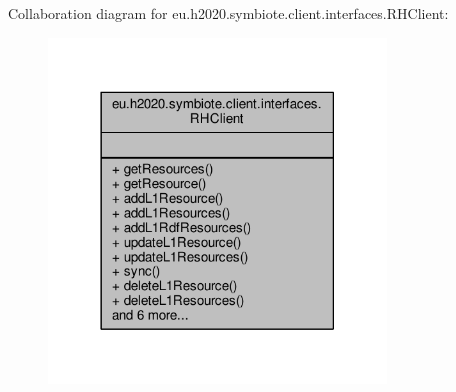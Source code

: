 Collaboration diagram for eu.\+h2020.\+symbiote.\+client.\+interfaces.\+R\+H\+Client\+:
\nopagebreak
\begin{figure}[H]
\begin{center}
\leavevmode
\includegraphics[width=254pt]{interfaceeu_1_1h2020_1_1symbiote_1_1client_1_1interfaces_1_1RHClient__coll__graph}
\end{center}
\end{figure}
